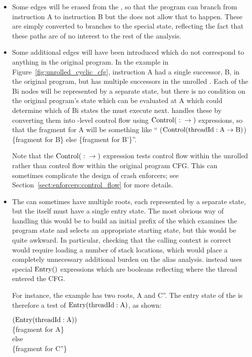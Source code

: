 \begin{itemize}
\item
  Some edges will be erased from the , so that the
  program can branch from instruction A to instruction B but the
   does not allow that to happen.  These are simply
  converted to branches to the special  state,
  reflecting the fact that these paths are of no interest to the rest
  of the analysis.

\item
  Some additional edges will have been introduced which do not
  correspond to anything in the original program.  In the example in
  Figure~\ref{fig:unrolled_cyclic_cfg}, instruction A had a single
  successor, B, in the original program, but has multiple successors
  in the unrolled .  Each of the Bi  nodes
  will be represented by a separate {\StateMachine} state, but there
  is no condition on the original program's state which can be
  evaluated at A which could determine which of Bi states the
  {\StateMachine} must execute next.  {\Technique} handles these by
  converting them into \StateMachine-level control flow using
  $\mathrm{Control}(\mathrm{}:\mathrm{} \rightarrow \mathrm{})$ expressions, so that the {\StateMachine}
  fragment for A will be something like ``
  ($\mathrm{Control}(\mathrm{threadId}:\mathrm{A} \rightarrow \mathrm{B})$) \{fragment for B\} else \{fragment
  for B'\}''.

  Note that the $\mathrm{Control}(\mathrm{}:\mathrm{} \rightarrow \mathrm{})$ expression tests control flow
  within the unrolled  rather than control flow within
  the original program CFG.  This can sometimes complicate the design
  of crash enforcers; see Section~\ref{sect:enforcers:control_flow}
  for more details.

\item
  The  can sometimes have multiple roots, each
  represented by a separate {\StateMachine} state, but the
  {\StateMachine} itself must have a single entry state.  The most
  obvious way of handling this would be to build an initial prefix of
  the {\StateMachine} which examines the program state and selects an
  appropriate starting state, but this would be quite awkward.  In
  particular, checking that the calling context is correct would
  require loading a number of stack locations, which would place a
  completely unnecessary additional burden on the alias analysis.
  {\Technique} instead uses special $\mathrm{Entry}()$ expressions which
  are booleans reflecting where the thread entered the CFG.

  For instance, the example  has two roots, A and C''.
  The entry state of the {\StateMachine} is therefore a test
  of $\mathrm{Entry}(\mathrm{threadId}:\mathrm{A})$, as shown:

   $(\mathrm{Entry}(\mathrm{threadId}:\mathrm{A}))$ \\
  \{fragment for A\} \\
  else \\
  \{fragment for C''\}


\end{itemize}

